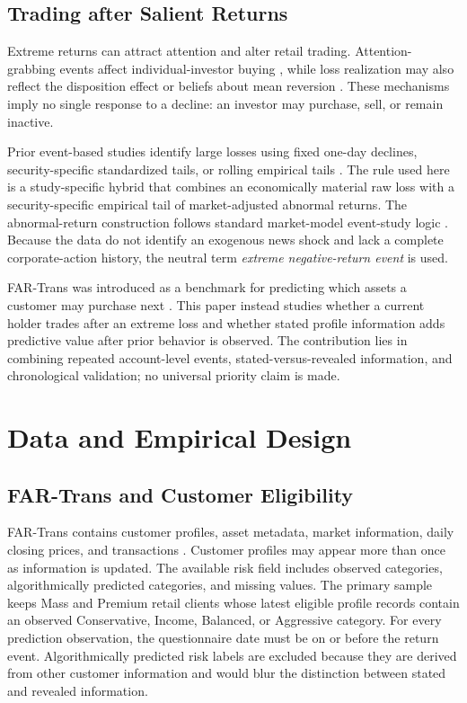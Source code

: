 \documentclass[conference]{IEEEtran}
\begin{document}
\subsection{Trading after Salient Returns}
Extreme returns can attract attention and alter retail trading. Attention-grabbing events affect individual-investor buying \cite{barber2008glitters}, while loss realization may also reflect the disposition effect or beliefs about mean reversion \cite{odean1998losses}. These mechanisms imply no single response to a decline: an investor may purchase, sell, or remain inactive.

Prior event-based studies identify large losses using fixed one-day declines, security-specific standardized tails, or rolling empirical tails \cite{cox1994declines,guo2024extreme,cardozo2026tail}. The rule used here is a study-specific hybrid that combines an economically material raw loss with a security-specific empirical tail of market-adjusted abnormal returns. The abnormal-return construction follows standard market-model event-study logic \cite{mackinlay1997event}. Because the data do not identify an exogenous news shock and lack a complete corporate-action history, the neutral term \emph{extreme negative-return event} is used.

FAR-Trans was introduced as a benchmark for predicting which assets a customer may purchase next \cite{sanzcruzado2024fartrans}. This paper instead studies whether a current holder trades after an extreme loss and whether stated profile information adds predictive value after prior behavior is observed. The contribution lies in combining repeated account-level events, stated-versus-revealed information, and chronological validation; no universal priority claim is made.

\section{Data and Empirical Design}
\subsection{FAR-Trans and Customer Eligibility}
FAR-Trans contains customer profiles, asset metadata, market information, daily closing prices, and transactions \cite{sanzcruzado2024fartrans}. Customer profiles may appear more than once as information is updated. The available risk field includes observed categories, algorithmically predicted categories, and missing values. The primary sample keeps Mass and Premium retail clients whose latest eligible profile records contain an observed Conservative, Income, Balanced, or Aggressive category. For every prediction observation, the questionnaire date must be on or before the return event. Algorithmically predicted risk labels are excluded because they are derived from other customer information and would blur the distinction between stated and revealed information.
\end{document}
